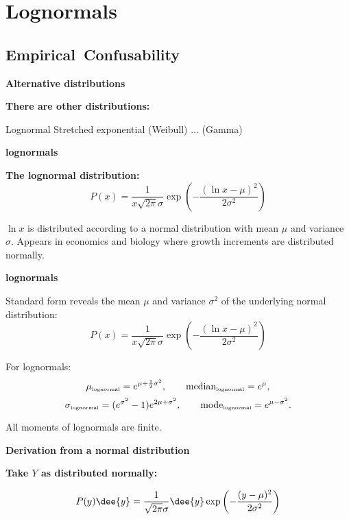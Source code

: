 \section{Lognormals}

\subsection{Empirical\ Confusability}

  \textbf{Alternative distributions}

  \textbf{There are other  distributions:}
    
     Lognormal
     Stretched exponential (Weibull)
     ... (Gamma)
    
  


  \textbf{lognormals}

  \textbf{The lognormal distribution:}
    $$
    P(x) = \frac{1}{x \sqrt{2\pi} \sigma}
    \exp 
    \left(
      -\frac{(\ln x-\mu)^2}
      {2\sigma^2}
    \right)
    $$
  

  
   $\ln x$ is distributed according 
    to a normal distribution with mean $\mu$ and variance $\sigma$.
   Appears in economics and biology where 
    growth increments are distributed normally.
  


  \textbf{lognormals}

  Standard form reveals the mean $\mu$ and
  variance $\sigma^2$ of the underlying 
  normal distribution:
  $$
  P(x) = \frac{1}{x \sqrt{2\pi} \sigma}
  \exp 
  \left(
    -\frac{(\ln x-\mu)^2}
    {2\sigma^2}
  \right)
  $$

  {
    For lognormals:
    $$
    \mu_{\mbox{\tiny lognormal}} = e^{\mu+\frac{1}{2}\sigma^2},
    \qquad
    \mbox{median}_{\mbox{\tiny lognormal}} = e^{\mu},
    $$
    $$
    \sigma_{\mbox{\tiny lognormal}} = (e^{\sigma^2} - 1 ) e^{2\mu + \sigma^2},
    \qquad
    \mbox{mode}_{\mbox{\tiny lognormal}} = e^{\mu-\sigma^2}.
    $$

    \alert{All moments of lognormals are finite.}
  }


  \textbf{Derivation from a normal distribution}

  \textbf{Take $Y$ as distributed normally:}
    
    
      $$
      P(y)\dee{y} = \frac{1}{\sqrt{2\pi} \sigma} \dee{y}
      \exp 
      \left(
        -\frac{(y-\mu)^2}
        {2\sigma^2}
      \right)
      $$
    
